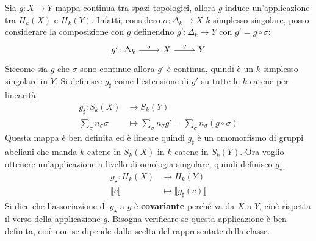 Sia $ g \colon X \to Y $ mappa continua tra spazi topologici,
allora
$ g $ induce un'applicazione tra $ H_k(X) $ e $ H_k(Y) $.
Infatti, considero $ \sigma \colon \Delta_k \to X $ $ k $-simplesso singolare, posso
considerare la composizione con $ g $ definendno $ g' \colon \Delta_k \to Y $ con $ g' = g \circ \sigma $:
\[
  \begin{tikzcd}
    g' \colon \Delta_k \arrow{r}{\sigma} &  X  \arrow{r}{g} & Y
  \end{tikzcd}
\]
Siccome sia $ g $ che $ \sigma $ sono continue allora $ g' $ è continua, quindi è un
$ k $-simplesso singolare in $ Y $.
Si definisce $ g_\sharp $ come l'estensione di $ g' $ su tutte le $ k $-catene
per linearità:
\begin{align*}
  g_\sharp \colon S_k(X) & \to S_k(Y) \\
  \sum_\sigma n_\sigma \sigma & \mapsto  \sum_\sigma n_\sigma g' =  \sum_\sigma n_\sigma ( g \circ \sigma )
\end{align*}
Questa mappa è ben definita ed è lineare quindi $ g_\sharp $ è un omomorfismo di
gruppi abeliani che manda $ k $-catene in $ S_k(X) $ in $ k $-catene
in $ S_k(Y) $.
Ora voglio ottenere un'applicazione a livello di omologia singolare,
quindi definisco $ g_\star $.
\begin{align*}
  g_\star \colon H_k(X) & \to H_k(Y) \\
  \llbracket c \rrbracket        & \mapsto  \llbracket g_\sharp (c) \rrbracket
\end{align*}
Si dice che l'associazione di $ g_\star $ a $ g $ è \textbf{covariante} perché va da
$ X $ a $ Y $, cioè rispetta il verso della applicazione $ g $. Bisogna
verificare se questa applicazione è ben definita, cioè non se dipende dalla
scelta del rappresentate della classe.

